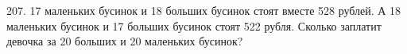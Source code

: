 207. 17 маленьких бусинок и 18 больших бусинок стоят вместе 528 рублей. А 18 маленьких бусинок и 17 больших бусинок стоят 522 рубля. Сколько заплатит девочка за 20 больших и 20 маленьких бусинок?\\
